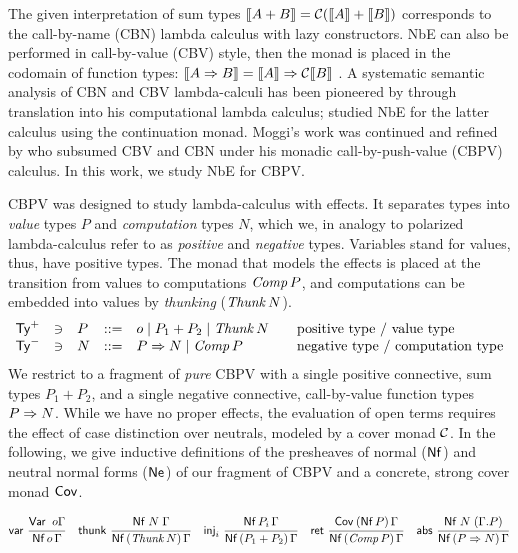 \documentclass[a4paper]{easychair}
\renewcommand{\patom}{\ensuremath{o}}
\begin{document}
The given interpretation of sum types
$\mathopen{{[\kern-0.14em[}} A + B \mathclose{{]\kern-0.14em]}} = \mathcal{C}(\mathopen{{[\kern-0.14em[}} A \mathclose{{]\kern-0.14em]}} + \mathopen{{[\kern-0.14em[}} B \mathclose{{]\kern-0.14em]}})$ corresponds to the call-by-name
(CBN) lambda calculus with lazy constructors.  NbE can also be
performed in call-by-value (CBV) style, then the monad is placed in
the codomain of function types: $\mathopen{{[\kern-0.14em[}} A \Rightarrow B \mathclose{{]\kern-0.14em]}} = \mathopen{{[\kern-0.14em[}} A \mathclose{{]\kern-0.14em]}} \Rightarrow \mathcal{C} \mathopen{{[\kern-0.14em[}} B \mathclose{{]\kern-0.14em]}}$
\citep{danvy:popl96}.  A systematic semantic analysis of CBN and CBV
lambda-calculi has been pioneered by \citet{moggi:infcomp91} through
translation into his computational lambda calculus;
\citet{filinski:tlca01} studied NbE for the latter calculus using the
continuation monad.  Moggi's work was continued and refined
by \citet{levy:hosc06} who subsumed CBV and CBN under his monadic
call-by-push-value (CBPV) calculus.  In this work, we study NbE for CBPV.

CBPV was designed to study lambda-calculus with effects.  It separates
types into \emph{value} types $P$ and \emph{computation} types $N$, which we, in
analogy to polarized lambda-calculus
\citep{zeilberger:PhD} %
refer to as \emph{positive} and \emph{negative} types.
Variables stand for values, thus, have positive types.
The monad that models the effects is placed at the transition from values
to computations $\mathit{Comp}\,P$, and computations can be embedded into
values by \emph{thunking} ($\mathit{Thunk}\,N$).
\[
\begin{array}{lllrl@{\qquad}l}
  \PTy & \ni & P & ::= & \patom
    \mid P_1 + P_2
    \mid \Thunk N
  & \mbox{positive type / value type}
\\
  \NTy & \ni & N & ::= & %
    P \To N
    \mid \Comp P
  & \mbox{negative type / computation type}
\\
\end{array}
\]
We restrict to a fragment of \emph{pure} CBPV
with a single positive connective, sum
types $P_1 + P_2$, and a single negative connective, call-by-value
function types $P \Rightarrow N$.  While we have no proper effects, the
evaluation of open terms requires the effect of case distinction over
neutrals, modeled by a cover monad $\mathcal{C}$.  In the following, we give
inductive definitions of the presheaves of
normal ($\mathsf{Nf}$) and neutral normal forms
($\mathsf{Ne}^{}$) of our fragment of CBPV and a concrete, strong cover monad $\mathsf{Cov}^{}$.
\begin{small}
\begin{gather*}
  \nru{\tvar}{\Var \patom \Gamma}{\PValNf {\patom} \Gamma}
\quad
  \nru{\tthunk}{\Nf N \Gamma}{\PValNfP{\Thunk N}\Gamma}
\quad
  \nru{\tinj_i}{\PValNf{P_i}\Gamma}{\PValNfP{P_1 + P_2}\Gamma}
\quad
  \nru{\tret}
      {\CoverP {\tVNf\,P}  \Gamma}
      {\NfP {\Comp P} \Gamma}
\quad
  \nru{\tabs}
      {\Nf N {(\cext \Gamma P)}}
      {\NfP {P \To N} \Gamma}
\end{gather*}
\end{small}
\end{document}
